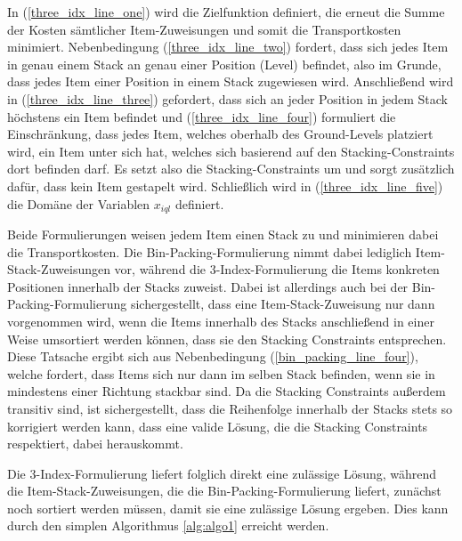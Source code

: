 In (\ref{three_idx_line_one}) wird die Zielfunktion definiert, die erneut die Summe der Kosten sämtlicher Item-Zuweisungen
und somit die Transportkosten minimiert.
Nebenbedingung (\ref{three_idx_line_two}) fordert, dass sich jedes Item in genau einem Stack an genau einer Position (Level) befindet,
also im Grunde, dass jedes Item einer Position in einem Stack zugewiesen wird.
Anschließend wird in (\ref{three_idx_line_three}) gefordert, dass sich an jeder Position in jedem Stack höchstens ein Item befindet und
(\ref{three_idx_line_four}) formuliert die Einschränkung, dass jedes Item, welches oberhalb des Ground-Levels platziert wird,
ein Item unter sich hat, welches sich basierend auf den Stacking-Constraints dort befinden darf.
Es setzt also die Stacking-Constraints um und sorgt zusätzlich dafür, dass kein Item  gestapelt wird.
Schließlich wird in (\ref{three_idx_line_five}) die Domäne der Variablen $x_{iql}$ definiert.

Beide Formulierungen weisen jedem Item einen Stack zu und minimieren dabei die Transportkosten.
Die Bin-Packing-Formulierung nimmt dabei lediglich Item-Stack-Zuweisungen vor, während die 3-Index-Formulierung die
Items konkreten Positionen innerhalb der Stacks zuweist. Dabei ist allerdings auch bei der Bin-Packing-Formulierung
sichergestellt, dass eine Item-Stack-Zuweisung nur dann vorgenommen wird, wenn die Items innerhalb des Stacks anschließend
in einer Weise umsortiert werden können, dass sie den Stacking Constraints entsprechen. Diese Tatsache ergibt sich aus Nebenbedingung (\ref{bin_packing_line_four}), welche fordert, dass Items sich nur dann im selben Stack befinden, wenn sie in mindestens einer Richtung stackbar sind.
Da die Stacking Constraints außerdem transitiv sind, ist sichergestellt, dass die Reihenfolge innerhalb der Stacks stets so korrigiert
werden kann, dass eine valide Lösung, die die Stacking Constraints respektiert, dabei herauskommt.

Die 3-Index-Formulierung liefert folglich direkt eine zulässige Lösung, während die Item-Stack-Zuweisungen, die die Bin-Packing-Formulierung liefert, zunächst noch sortiert werden müssen, damit sie eine zulässige Lösung ergeben. Dies kann durch den simplen Algorithmus \ref{alg:algo1} erreicht werden.




